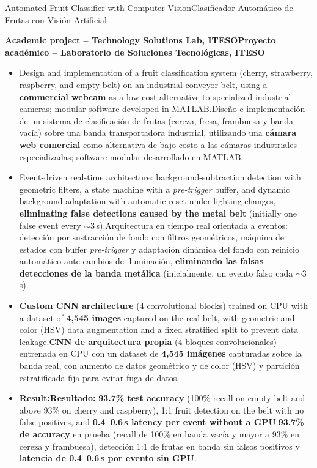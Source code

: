 \documentclass[10pt,a4paper,withhyper]{altacv}
\newcommand{\tr}[2]{\ifEN #2\else #1\fi}
\renewcommand{\cvevent}[4]{%
  \Needspace{6\baselineskip}%
  {\large\color{emphasis}#1\par}
  \smallskip\normalsize
  \ifstrequal{#2}{}{}{%
  \textbf{\color{accent}#2}\par
  \smallskip}%
  \ifstrequal{#3}{}{}{%
    {\small\makebox[0.5\linewidth][l]%
      {\BeginAccSupp{method=pdfstringdef,ActualText={\datename:}}\cvDateMarker\EndAccSupp{}~#3}%
    }}%
  \ifstrequal{#4}{}{}{%
    {\small\makebox[0.5\linewidth][l]%
      {\BeginAccSupp{method=pdfstringdef,ActualText={\locationname:}}\cvLocationMarker\EndAccSupp{}~#4}%
    }}\par
  \smallskip\normalsize
}
\begin{document}
\cvevent{\tr{Clasificador Automático de Frutas con Visión Artificial}{Automated Fruit Classifier with Computer Vision}}{\tr{Proyecto académico -- Laboratorio de Soluciones Tecnológicas, ITESO}{Academic project -- Technology Solutions Lab, ITESO}}{}{}
\begin{itemize}
\item \tr{Diseño e implementación de un sistema de clasificación de frutas (cereza, fresa, frambuesa y banda vacía) sobre una banda transportadora industrial, utilizando una \textbf{cámara web comercial} como alternativa de bajo costo a las cámaras industriales especializadas; software modular desarrollado en MATLAB.}{Design and implementation of a fruit classification system (cherry, strawberry, raspberry, and empty belt) on an industrial conveyor belt, using a \textbf{commercial webcam} as a low-cost alternative to specialized industrial cameras; modular software developed in MATLAB.}
\item \tr{Arquitectura en tiempo real orientada a eventos: detección por sustracción de fondo con filtros geométricos, máquina de estados con buffer \textit{pre-trigger} y adaptación dinámica del fondo con reinicio automático ante cambios de iluminación, \textbf{eliminando las falsas detecciones de la banda metálica} (inicialmente, un evento falso cada $\sim$3\,s).}{Event-driven real-time architecture: background-subtraction detection with geometric filters, a state machine with a \textit{pre-trigger} buffer, and dynamic background adaptation with automatic reset under lighting changes, \textbf{eliminating false detections caused by the metal belt} (initially one false event every $\sim$3\,s).}
\item \tr{\textbf{CNN de arquitectura propia} (4 bloques convolucionales) entrenada en CPU con un dataset de \textbf{4{,}545 imágenes} capturadas sobre la banda real, con aumento de datos geométrico y de color (HSV) y partición estratificada fija para evitar fuga de datos.}{\textbf{Custom CNN architecture} (4 convolutional blocks) trained on CPU with a dataset of \textbf{4,545 images} captured on the real belt, with geometric and color (HSV) data augmentation and a fixed stratified split to prevent data leakage.}
\item \textbf{\tr{Resultado:}{Result:}} \tr{\textbf{93.7\% de accuracy} en prueba (recall de 100\% en banda vacía y mayor a 93\% en cereza y frambuesa), detección 1:1 de frutas en banda sin falsos positivos y \textbf{latencia de 0.4--0.6\,s por evento sin GPU}.}{\textbf{93.7\% test accuracy} (100\% recall on empty belt and above 93\% on cherry and raspberry), 1:1 fruit detection on the belt with no false positives, and \textbf{0.4--0.6\,s latency per event without a GPU}.}
\end{itemize}
\end{document}

